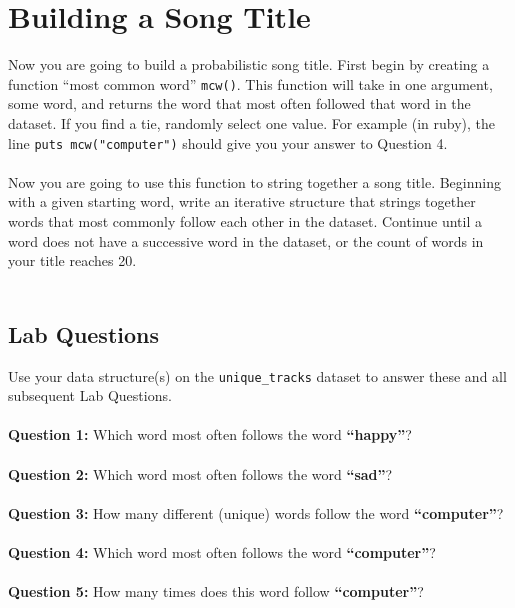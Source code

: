 \documentclass{article}
\begin{document}
\section*{Building a Song Title}
Now you are going to build a probabilistic song title. First begin by creating a function ``most common word'' \verb|mcw()|. This function will take in one argument, some word, and returns the word that most often followed that word in the dataset. If you find a tie, randomly select one value. For example (in ruby), the line \verb|puts mcw("computer")| should give you your answer to Question 4.
\\\\
Now you are going to use this function to string together a song title. Beginning with a given starting word, write an iterative structure that strings together words that most commonly follow each other in the dataset. Continue until a word does not have a successive word in the dataset, or the count of words in your title reaches 20.
\\\\
\begin{tcolorbox}
 \section*{Lab Questions}
 Use your data structure(s) on the \verb|unique_tracks| dataset to answer these and all subsequent Lab Questions.
 \\\\
 \noindent \textbf{Question 1:} Which word most often follows the word \textbf{``happy''}?
 \\\\
 \noindent \textbf{Question 2:} Which word most often follows the word \textbf{``sad''}?
 \\\\
 \noindent \textbf{Question 3:} How many different (unique) words follow the word \textbf{``computer''}?
 \\\\
 \noindent \textbf{Question 4:} Which word most often follows the word \textbf{``computer''}?
 \\\\
 \noindent \textbf{Question 5:} How many times does this word follow \textbf{``computer''}?
 
\end{tcolorbox}
\end{document}

